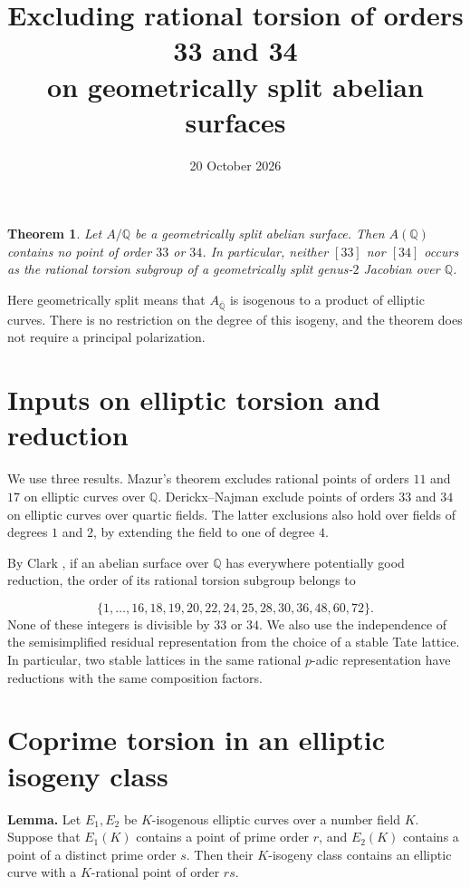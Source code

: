 \documentclass[11pt]{article}
\title{Excluding rational torsion of orders 33 and 34\\on geometrically split abelian surfaces}
\author{}
\date{20 October 2026}
\newtheorem{theorem}{Theorem}
\newcommand{\Q}{\mathbb Q}
\begin{document}
\maketitle
\begin{theorem}\label{thm:main}
Let \(A/\Q\) be a geometrically split abelian surface. Then \(A(\Q)\)
contains no point of order \(33\) or \(34\).
In particular, neither \([33]\) nor \([34]\) occurs as the rational torsion
subgroup of a geometrically split genus-\(2\) Jacobian over \(\Q\).
\end{theorem}
Here geometrically split means that \(A_{\overline{\Q}}\) is isogenous to
a product of elliptic curves. There is no restriction on the degree of
this isogeny, and the theorem does not require a principal polarization.

\section{Inputs on elliptic torsion and reduction}\label{sec:inputs}
We use three results. Mazur's theorem \cite{Mazur} excludes rational points of orders \(11\) and \(17\) on elliptic curves over \(\Q\). Derickx--Najman \cite[Theorem 1.1]{DN} exclude points of orders \(33\) and \(34\) on elliptic curves over quartic fields. The latter exclusions also hold over fields of degrees \(1\) and \(2\), by extending the field to one of degree \(4\).

By Clark \cite[Theorem 5]{Clark}, if an abelian surface over \(\Q\) has everywhere potentially good reduction, the order of its rational torsion subgroup belongs to

\[
\{1,\ldots,16,18,19,20,22,24,25,28,30,36,48,60,72\}.
\]
None of these integers is divisible by \(33\) or \(34\). We also use the independence of the semisimplified residual representation from the choice of a stable Tate lattice. In particular, two stable lattices in the same rational \(p\)-adic representation have reductions with the same composition factors.


\section{Coprime torsion in an elliptic isogeny class}\label{sec:coprime-torsion}
\textbf{Lemma.} Let \(E_1,E_2\) be \(K\)-isogenous elliptic curves over a number field \(K\). Suppose that \(E_1(K)\) contains a point of prime order \(r\), and \(E_2(K)\) contains a point of a distinct prime order \(s\). Then their \(K\)-isogeny class contains an elliptic curve with a \(K\)-rational point of order \(rs\).
\end{document}
